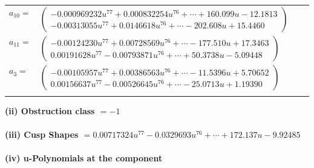 \documentclass[1p]{elsarticle_modified}
\theoremstyle{definition}
\begin{document}
\begin{tabular}{m{7pt} m{180pt} m{7pt} m{180pt} }
\flushright $a_{10}=$&$\begin{pmatrix}-0.000969232 u^{77}+0.000832254 u^{76}+\cdots+160.099 u-12.1813\\-0.00313055 u^{77}+0.0146618 u^{76}+\cdots-202.608 u+15.4460\end{pmatrix}$ \\
\flushright $a_{11}=$&$\begin{pmatrix}-0.00124230 u^{77}+0.00728569 u^{76}+\cdots-177.510 u+17.3463\\0.00191628 u^{77}-0.00793871 u^{76}+\cdots+50.3738 u-5.09448\end{pmatrix}$ \\
\flushright $a_{3}=$&$\begin{pmatrix}-0.00105957 u^{77}+0.00386563 u^{76}+\cdots-11.5396 u+5.70652\\0.00156637 u^{77}-0.00526645 u^{76}+\cdots-25.0713 u+1.19390\end{pmatrix}$\\&\end{tabular}
\flushleft \textbf{(ii) Obstruction class $= -1$}\\~\\
\flushleft \textbf{(iii) Cusp Shapes $= 0.00717324 u^{77}-0.0329693 u^{76}+\cdots+172.137 u-9.92485$}\\~\\
\newpage\renewcommand{\arraystretch}{1}
\flushleft \textbf{(iv) u-Polynomials at the component}\newline \\
\end{document}
